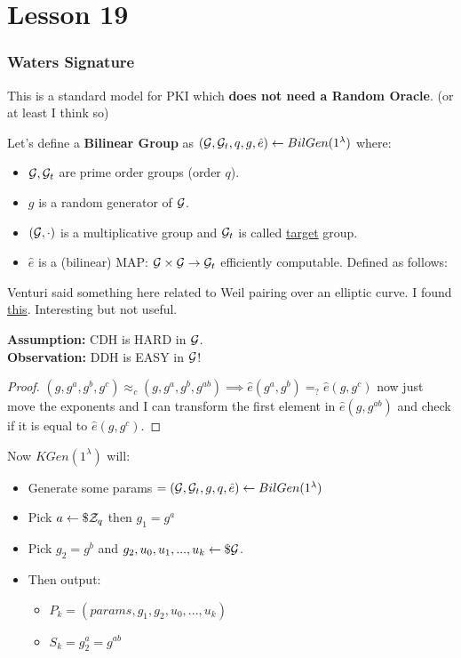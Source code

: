\chapter*{Lesson 19}

\subsection{Waters Signature}
This is a standard model for PKI which \textbf{does not need a Random Oracle}. (or at least I think so)

Let's define a \textbf{Bilinear Group} as $(\mathcal{G}, \mathcal{G}_t, q, g, \hat{e})\leftarrow BilGen(1^{\lambda})$ where:
\begin{itemize}
    \item $\mathcal{G}, \mathcal{G}_t$ are prime order groups (order $q$).
    \item $g$ is a random generator of $\mathcal{G}$.
    \item $(\mathcal{G}, \cdot)$ is a multiplicative group and $\mathcal{G}_t$ is called \underline{target} group.
    \item $\hat{e}$ is a (bilinear) MAP: $\mathcal{G} \times \mathcal{G} \rightarrow \mathcal{G}_t$ efficiently computable. Defined as follows:
    
\end{itemize}

Venturi said something here related to Weil pairing over an elliptic curve. I found \href{https://www.math.auckland.ac.nz/~sgal018/crypto-book/ch26.pdf}{this}. Interesting but not useful.

\noindent\textbf{Assumption:} CDH is HARD in $\mathcal{G}$.\\
\textbf{Observation:} DDH is EASY in $\mathcal{G}$!
\begin{proof}
    $(g,g^a,g^b,g^c)\approx_c (g,g^a,g^b,g^{ab}) \implies \hat{e}(g^a,g^b)=_?\hat{e}(g,g^c)$ now just move the exponents and I can transform the first element in $\hat{e}(g,g^{ab})$ and check if it is equal to $\hat{e}(g,g^c)$.
\end{proof}

Now $KGen(1^{\lambda})$ will:
\begin{itemize}
    \item Generate some params $ =(\mathcal{G},\mathcal{G}_t,g,q,\hat{e})\leftarrow BilGen(1^{\lambda})$ 
    \item Pick $a \leftarrow\$ \mathcal{Z}_q$ then $g_1=g^a$
    \item Pick $g_2=g^b$ and $g_2,u_0,u_1,...,u_k \leftarrow\$ \mathcal{G}$.
    \item Then output: 
    \begin{itemize}
        \item $P_k=(params, g_1,g_2,u_0,...,u_k)$
        \item $S_k=g_2^a=g^{ab}$
    \end{itemize}
\end{itemize}

